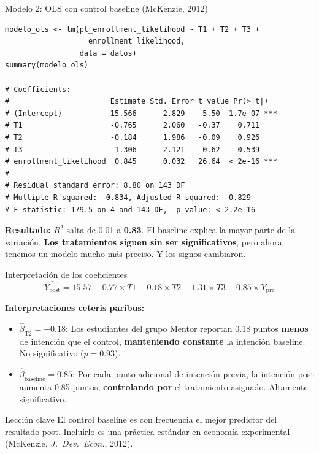 \documentclass[aspectratio=169, 11pt]{beamer}
\begin{document}
\begin{frame}[fragile]{Modelo 2: OLS con control baseline (McKenzie, 2012)}
\begin{lstlisting}[basicstyle=\ttfamily\scriptsize]
modelo_ols <- lm(pt_enrollment_likelihood ~ T1 + T2 + T3 +
                   enrollment_likelihood,
                 data = datos)
summary(modelo_ols)

# Coefficients:
#                       Estimate Std. Error t value Pr(>|t|)
# (Intercept)           15.566      2.829    5.50  1.7e-07 ***
# T1                    -0.765      2.060   -0.37    0.711
# T2                    -0.184      1.986   -0.09    0.926
# T3                    -1.306      2.121   -0.62    0.539
# enrollment_likelihood  0.845      0.032   26.64  < 2e-16 ***
# ---
# Residual standard error: 8.80 on 143 DF
# Multiple R-squared:  0.834, Adjusted R-squared:  0.829
# F-statistic: 179.5 on 4 and 143 DF,  p-value: < 2.2e-16
\end{lstlisting}

\vspace{0.1cm}
{\small \textbf{Resultado:} $R^2$ salta de 0.01 a \textbf{0.83}. El baseline explica la mayor parte de la variación. \textbf{Los tratamientos siguen sin ser significativos}, pero ahora tenemos un modelo mucho más preciso. Y los signos cambiaron.}
\end{frame}

\begin{frame}{Interpretación de los coeficientes}
\[
\widehat{Y_{\text{post}}} = 15.57 - 0.77 \times T1 - 0.18 \times T2 - 1.31 \times T3 + 0.85 \times Y_{\text{pre}}
\]

\vspace{0.2cm}
\textbf{Interpretaciones ceteris paribus:}
\begin{itemize}
  \item $\hat{\beta}_{\text{T2}} = -0.18$: Los estudiantes del grupo Mentor reportan 0.18 puntos \textbf{menos} de intención que el control, \textbf{manteniendo constante} la intención baseline. No significativo ($p = 0.93$).

  \item $\hat{\beta}_{\text{baseline}} = 0.85$: Por cada punto adicional de intención previa, la intención post aumenta 0.85 puntos, \textbf{controlando por} el tratamiento asignado. Altamente significativo.
\end{itemize}

\vspace{0.2cm}
\begin{alertblock}{Lección clave}
El control baseline es con frecuencia el mejor predictor del resultado post. Incluirlo es una práctica estándar en economía experimental (McKenzie, \textit{J.\ Dev.\ Econ.}, 2012).
\end{alertblock}
\end{frame}
\end{document}
